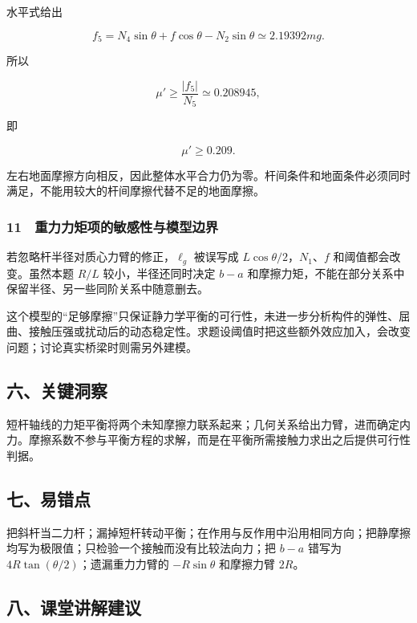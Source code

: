 \documentclass[12pt,a4paper,fontset=fandol]{ctexart}
\begin{document}
水平式给出

\[f_5=N_4\sin\theta+f\cos\theta-N_2\sin\theta
\simeq2.19392mg.\]

所以

\[\mu'\ge\frac{|f_5|}{N_5}\simeq0.208945,\]

即

\[\boxed{\mu'\ge0.209.}\]

左右地面摩擦方向相反，因此整体水平合力仍为零。杆间条件和地面条件必须同时满足，不能用较大的杆间摩擦代替不足的地面摩擦。

\subsubsection{11　重力力矩项的敏感性与模型边界}\label{ux91cdux529bux529bux77e9ux9879ux7684ux654fux611fux6027ux4e0eux6a21ux578bux8fb9ux754c}

若忽略杆半径对质心力臂的修正，\(\ell_g\) 被误写成
\(L\cos\theta/2\)，\(N_1\)、\(f\) 和阈值都会改变。虽然本题 \(R/L\)
较小，半径还同时决定 \(b-a\)
和摩擦力矩，不能在部分关系中保留半径、另一些同阶关系中随意删去。

这个模型的``足够摩擦''只保证静力学平衡的可行性，未进一步分析构件的弹性、屈曲、接触压强或扰动后的动态稳定性。求题设阈值时把这些额外效应加入，会改变问题；讨论真实桥梁时则需另外建模。

\subsection{六、关键洞察}\label{ux516dux5173ux952eux6d1eux5bdf-3}

短杆轴线的力矩平衡将两个未知摩擦力联系起来；几何关系给出力臂，进而确定内力。摩擦系数不参与平衡方程的求解，而是在平衡所需接触力求出之后提供可行性判据。

\subsection{七、易错点}\label{ux4e03ux6613ux9519ux70b9-3}

把斜杆当二力杆；漏掉短杆转动平衡；在作用与反作用中沿用相同方向；把静摩擦均写为极限值；只检验一个接触而没有比较法向力；把
\(b-a\) 错写为 \(4R\tan(\theta/2)\)；遗漏重力力臂的 \(-R\sin\theta\)
和摩擦力臂 \(2R\)。

\subsection{八、课堂讲解建议}\label{ux516bux8bfeux5802ux8bb2ux89e3ux5efaux8bae-3}
\end{document}
